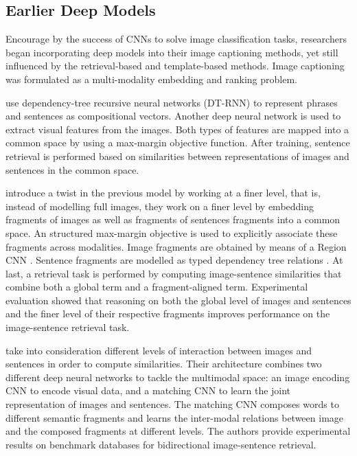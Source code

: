 \subsection{Earlier Deep Models}

Encourage by the success of CNNs to solve image classification tasks, researchers began incorporating deep models into their image captioning methods, yet still influenced by the retrieval-based and template-based methods. Image captioning was formulated as a multi-modality embedding \citet{Frome2013} and ranking problem.

\citet{Socher2014} use dependency-tree recursive neural networks (DT-RNN) to represent phrases and sentences as compositional vectors. Another deep neural network \citep{Le2011} is used to extract visual features from the images. Both types of  features are mapped into a common space by using a max-margin objective function. After training, sentence retrieval is performed based on similarities between representations of images and sentences in the common space.

\citet{Karpathy2014} introduce a twist in the previous model by working at a finer level, that is, instead of modelling full images, they work on a finer level by embedding fragments of images as well as fragments of sentences fragments into a common space.  An structured max-margin objective is used to explicitly associate these fragments across modalities. Image fragments are obtained by means of a Region CNN \citep{Girshick2014}. Sentence fragments are modelled as typed dependency tree relations \citep{DeMarneffe2006}. At last, a retrieval task is performed by computing image-sentence similarities that combine both a global term and a fragment-aligned term. Experimental evaluation showed that reasoning on both the global level of images and sentences and the finer level of their respective fragments improves performance on the image-sentence retrieval task.

\citet{Ma2015} take into consideration different levels of interaction between images and sentences in order to compute similarities. Their architecture combines two different deep neural networks to tackle the multimodal space: an image encoding CNN \citep{Simonyan2015} to encode visual data, and a matching CNN \citep{Hu2014} to learn the joint representation of images and sentences. The matching CNN composes words to different semantic fragments and learns the inter-modal relations between image and the composed fragments at different levels. The authors provide experimental results on benchmark databases for bidirectional image-sentence retrieval.

